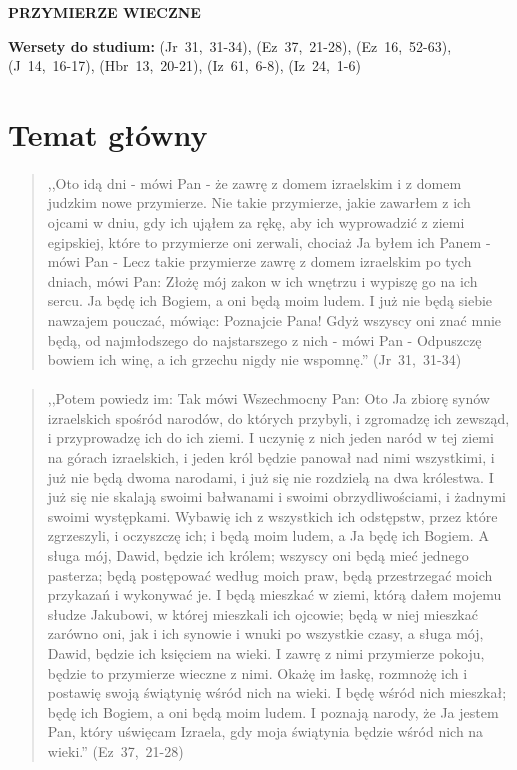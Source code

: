 \documentclass[10pt,a4paper,oneside]{article}
\begin{document}
\centerline{\textbf{\MakeUppercase{Przymierze wieczne}}}
\begin{center}
\textbf{Wersety do studium:} \mbox{(Jr 31, 31-34)}, \mbox{(Ez 37, 21-28)}, \mbox{(Ez 16, 52-63)}, \mbox{(J 14, 16-17)}, \mbox{(Hbr 13, 20-21)}, \mbox{(Iz 61, 6-8)}, \mbox{(Iz 24, 1-6)}
\end{center}
\section{Temat główny}
\paragraph{}
\begin{quote}
,,Oto idą dni - mówi Pan - że zawrę z domem izraelskim i z domem judzkim nowe przymierze. Nie takie przymierze, jakie zawarłem z ich ojcami w dniu, gdy ich ująłem za rękę, aby ich wyprowadzić z ziemi egipskiej, które to przymierze oni zerwali, chociaż Ja byłem ich Panem - mówi Pan - Lecz takie przymierze zawrę z domem izraelskim po tych dniach, mówi Pan: Złożę mój zakon w ich wnętrzu i wypiszę go na ich sercu. Ja będę ich Bogiem, a oni będą moim ludem. I już nie będą siebie nawzajem pouczać, mówiąc: Poznajcie Pana! Gdyż wszyscy oni znać mnie będą, od najmłodszego do najstarszego z nich - mówi Pan - Odpuszczę bowiem ich winę, a ich grzechu nigdy nie wspomnę.'' \mbox{(Jr 31, 31-34)}
\end{quote}
\paragraph{}
\begin{quote}
,,Potem powiedz im: Tak mówi Wszechmocny Pan: Oto Ja zbiorę synów izraelskich spośród narodów, do których przybyli, i zgromadzę ich zewsząd, i przyprowadzę ich do ich ziemi. I uczynię z nich jeden naród w tej ziemi na górach izraelskich, i jeden król będzie panował nad nimi wszystkimi, i już nie będą dwoma narodami, i już się nie rozdzielą na dwa królestwa. I już się nie skalają swoimi bałwanami i swoimi obrzydliwościami, i żadnymi swoimi występkami. Wybawię ich z wszystkich ich odstępstw, przez które zgrzeszyli, i oczyszczę ich; i będą moim ludem, a Ja będę ich Bogiem. A sługa mój, Dawid, będzie ich królem; wszyscy oni będą mieć jednego pasterza; będą postępować według moich praw, będą przestrzegać moich przykazań i wykonywać je. I będą mieszkać w ziemi, którą dałem mojemu słudze Jakubowi, w której mieszkali ich ojcowie; będą w niej mieszkać zarówno oni, jak i ich synowie i wnuki po wszystkie czasy, a sługa mój, Dawid, będzie ich księciem na wieki. I zawrę z nimi przymierze pokoju, będzie to przymierze wieczne z nimi. Okażę im łaskę, rozmnożę ich i postawię swoją świątynię wśród nich na wieki. I będę wśród nich mieszkał; będę ich Bogiem, a oni będą moim ludem. I poznają narody, że Ja jestem Pan, który uświęcam Izraela, gdy moja świątynia będzie wśród nich na wieki.'' \mbox{(Ez 37, 21-28)}
\end{quote}
\end{document}
